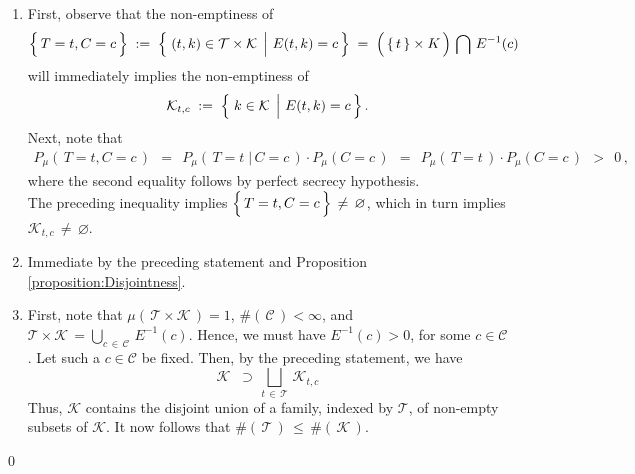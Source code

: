 \proof
\begin{enumerate}
\item
	First, observe that the non-emptiness of
	\begin{equation*}
	\left\{\,\overset{{\color{white}.}}{T}=t,C=c\,\right\}
	\; := \;
		\left\{\,\left. (t,k) \overset{{\color{white}.}}{\in} \mathcal{T}\times\mathcal{K} \;\,\right\vert\, E(t,k) = c\,\right\}
	\; = \;
		\left(\,\{\,t\,\} \overset{{\color{white}.}}{\times} K\,\right) \, \bigcap \, E^{-1}(c)
	\end{equation*}
	will immediately implies the non-emptiness of
	\begin{equation*}
	\mathcal{K}_{t,c} \; := \; \left\{\,\left. k \overset{{\color{white}.}}{\in} \mathcal{K} \;\,\right\vert\, E(t,k) = c\,\right\}.
	\end{equation*}
	Next, note that
	\begin{eqnarray*}
	P_{\mu}\!\left(\,T = t, C = c\,\right)
	\;\, = \;\,
		P_{\mu}\!\left(\,T = t \;\vert\, C = c\,\right) \cdot P_{\mu}\!\left(C=c\,\right)
	\;\, = \;\,
		P_{\mu}\!\left(\,T = t \,\right) \cdot P_{\mu}\!\left(C=c\,\right)
	\;\, > \;\,
		0\,,
	\end{eqnarray*}
	where the second equality follows by perfect secrecy hypothesis.\\
	The preceding inequality implies
	$\left\{\,\overset{{\color{white}.}}{T}=t,C=c\,\right\} \,\neq\, \varnothing$,
	which in turn implies $\mathcal{K}_{t,c} \,\neq\, \varnothing$.
\item
	Immediate by the preceding statement and Proposition \ref{proposition:Disjointness}.
\item
	First, note that
	$\mu(\,\mathcal{T} \times \mathcal{K}\,) = 1$,
	$\#\!\left(\,\mathcal{C}\,\right) < \infty$, and
	$\mathcal{T} \times \mathcal{K} \, = \underset{c\,\in\,\mathcal{C}}{\bigcup}\,E^{-1}(c)$.
	Hence, we must have $E^{-1}(c) > 0$, for some $c \in \mathcal{C}$.
	Let such a $c \in \mathcal{C}$ be fixed.
	Then, by the preceding statement, we have
	\begin{equation*}
	\mathcal{K}
	\;\; \supset \,
		\underset{t\,\in\,\mathcal{T}}{\bigsqcup}\, \mathcal{K}_{t,c}
	\end{equation*}
	Thus, $\mathcal{K}$ contains the disjoint union of a family, indexed by $\mathcal{T}$,
	of non-empty subsets of $\mathcal{K}$.
	It now follows that $\#\!\left(\,\mathcal{T}\,\right) \,\leq\, \#\!\left(\,\mathcal{K}\,\right)$.
\end{enumerate}
\qed

